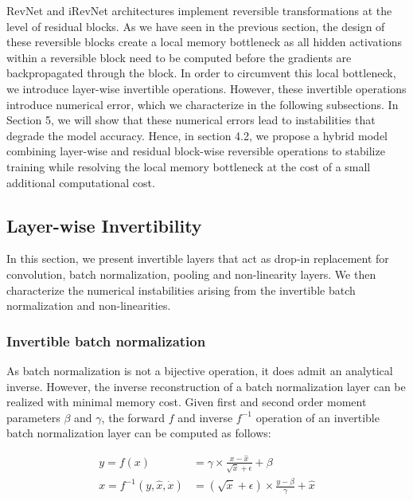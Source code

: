 \documentclass[twocolumn]{bmcart}
\begin{document}
RevNet and iRevNet architectures implement reversible transformations at the level of residual blocks. 
As we have seen in the previous section, the design of these reversible blocks create a local memory bottleneck as all hidden activations within a reversible block need to be computed before the gradients are backpropagated through the block.
In order to circumvent this local bottleneck, we introduce layer-wise invertible operations. 
However, these invertible operations introduce numerical error, which we characterize in the following subsections.
In Section 5, we will show that these numerical errors lead to instabilities that degrade the model accuracy.
Hence, in section 4.2, we propose a hybrid model combining layer-wise and residual block-wise reversible operations to stabilize training while resolving the local memory bottleneck at the cost of a small additional computational cost.

\subsection{Layer-wise Invertibility}

In this section, we present invertible layers that act as drop-in replacement for convolution, batch normalization, pooling and non-linearity layers. We then characterize the numerical instabilities arising from the invertible batch normalization and non-linearities.

\subsubsection{Invertible batch normalization}

As batch normalization is not a bijective operation, it does admit an analytical inverse.
However, the inverse reconstruction of a batch normalization layer can be realized with minimal memory cost.
Given first and second order moment parameters $\beta$ and $\gamma$, the forward $f$ and inverse $f^{-1}$ operation of an invertible batch normalization layer can be computed as follows:

\begin{subequations}
\begin{align}
y = f(x) &= \gamma \times \frac{x - \hat{x}}{\sqrt{\dot{x}} + \epsilon} + \beta \\
x = f^{-1}(y, \hat{x}, \dot{x}) &= (\sqrt{\dot{x}} + \epsilon) \times \frac{y -  \beta}{\gamma}  + \hat{x}
\end{align}
\end{subequations}
\end{document}
